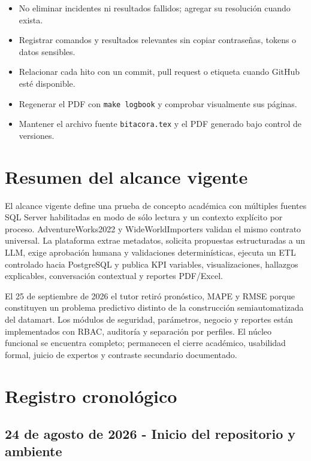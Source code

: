 \documentclass[11pt,letterpaper]{article}
\newcommand{\file}[1]{\texttt{#1}}
\begin{document}
\begin{itemize}
  \item No eliminar incidentes ni resultados fallidos; agregar su resolución cuando exista.
  \item Registrar comandos y resultados relevantes sin copiar contraseñas, tokens o datos sensibles.
  \item Relacionar cada hito con un commit, pull request o etiqueta cuando GitHub esté disponible.
  \item Regenerar el PDF con \file{make logbook} y comprobar visualmente sus páginas.
  \item Mantener el archivo fuente \file{bitacora.tex} y el PDF generado bajo control de versiones.
\end{itemize}

\section{Resumen del alcance vigente}

El alcance vigente define una prueba de concepto académica con múltiples fuentes SQL Server habilitadas en modo de sólo lectura y un contexto explícito por proceso. AdventureWorks2022 y WideWorldImporters validan el mismo contrato universal. La plataforma extrae metadatos, solicita propuestas estructuradas a un LLM, exige aprobación humana y validaciones determinísticas, ejecuta un ETL controlado hacia PostgreSQL y publica KPI variables, visualizaciones, hallazgos explicables, conversación contextual y reportes PDF/Excel.

El 25 de septiembre de 2026 el tutor retiró pronóstico, MAPE y RMSE porque constituyen un problema predictivo distinto de la construcción semiautomatizada del datamart. Los módulos de seguridad, parámetros, negocio y reportes están implementados con RBAC, auditoría y separación por perfiles. El núcleo funcional se encuentra completo; permanecen el cierre académico, usabilidad formal, juicio de expertos y contraste secundario documentado.

\section{Registro cronológico}

\subsection{24 de agosto de 2026 - Inicio del repositorio y ambiente}
\end{document}
